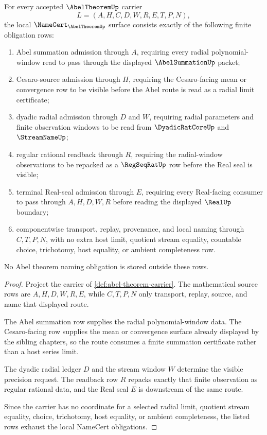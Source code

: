 \begin{theorem}
\label{thm:abel-theorem-namecert-obligations}
For every accepted $\AbelTheoremUp$ carrier
$$
L=(A,H,C,D,W,R,E,T,P,N),
$$
the local $\NameCert_{\AbelTheoremUp}$ surface consists exactly of the following finite obligation rows:
\begin{enumerate}
\item Abel summation admission through $A$, requiring every radial polynomial-window read to pass through the displayed $\AbelSummationUp$ packet;
\item Cesaro-source admission through $H$, requiring the Cesaro-facing mean or convergence row to be visible before the Abel route is read as a radial limit certificate;
\item dyadic radial admission through $D$ and $W$, requiring radial parameters and finite observation windows to be read from $\DyadicRatCoreUp$ and $\StreamNameUp$;
\item regular rational readback through $R$, requiring the radial-window observations to be repacked as a $\RegSeqRatUp$ row before the Real seal is visible;
\item terminal Real-seal admission through $E$, requiring every Real-facing consumer to pass through $A,H,D,W,R$ before reading the displayed $\RealUp$ boundary;
\item componentwise transport, replay, provenance, and local naming through $C,T,P,N$, with no extra host limit, quotient stream equality, countable choice, trichotomy, host equality, or ambient completeness row.
\end{enumerate}
No Abel theorem naming obligation is stored outside these rows.
\end{theorem}
\begin{proof}
Project the carrier of \autoref{def:abel-theorem-carrier}. The mathematical source rows are $A,H,D,W,R,E$, while $C,T,P,N$ only transport, replay, source, and name that displayed route.

The Abel summation row supplies the radial polynomial-window data. The Cesaro-facing row supplies the mean or convergence surface already displayed by the sibling chapters, so the route consumes a finite summation certificate rather than a host series limit.

The dyadic radial ledger $D$ and the stream window $W$ determine the visible precision request. The readback row $R$ repacks exactly that finite observation as regular rational data, and the Real seal $E$ is downstream of the same route.

Since the carrier has no coordinate for a selected radial limit, quotient stream equality, choice, trichotomy, host equality, or ambient completeness, the listed rows exhaust the local NameCert obligations.
\end{proof}

